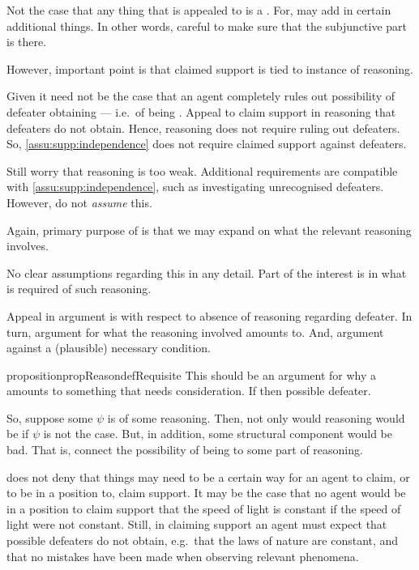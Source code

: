 \begin{note}
  Not the case that any thing that is appealed to is a \requ{}.
  For, may add in certain additional things.
  In other words, careful to make sure that the subjunctive part is there.
\end{note}

\begin{note}
  However, important point is that claimed support is tied to instance of reasoning.

  Given \nfcs{} it need not be the case that an agent completely rules out possibility of defeater obtaining --- i.e.\ of being \mom{}.
  Appeal to claim support in reasoning that defeaters do not obtain.
  Hence, reasoning does not require ruling out defeaters.
  So, \autoref{assu:supp:independence} does not require claimed support against defeaters.

  Still worry that reasoning is too weak.
  Additional requirements are compatible with \autoref{assu:supp:independence}, such as investigating unrecognised defeaters.
  However, do not \emph{assume} this.

  Again, primary purpose of \eiS{} is that we may expand on what the relevant reasoning involves.

  No clear assumptions regarding this in any detail.
  Part of the interest is in what is required of such reasoning.

  Appeal in argument is with respect to absence of reasoning regarding defeater.
  In turn, argument for what the reasoning involved amounts to.
  And, argument against a (plausible) necessary condition.
\end{note}


\begin{note}
  \begin{restatable}[]{proposition}{propReasondefRequisite}\label{prop:reason-requ}
    {
      \color{red} This should be an argument for why a \requ{} amounts to something that needs consideration.
    }
    If \requ{} then possible defeater.
  \end{restatable}

  So, suppose some \(\psi\) is \requ{} of some reasoning.
  Then, not only would reasoning would be \mom{} if \(\psi\) is not the case.
  But, in addition, some structural component would be bad.
  That is, connect the possibility of being \mom{} to some part of reasoning.
\end{note}

\begin{note}
  \eiS{} does not deny that things may need to be a certain way for an agent to claim, or to be in a position to, claim support.
  It may be the case that no agent would be in a position to claim support that the speed of light is constant if the speed of light were not constant.
  Still, in claiming support an agent must expect that possible defeaters do not obtain, e.g.\ that the laws of nature are constant, and that no mistakes have been made when observing relevant phenomena.
\end{note}

